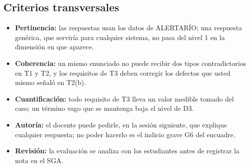 \documentclass[11pt]{article}
\newcommand{\subseccion}[1]{\subsection{\textcolor{midblue}{#1}}}
\begin{document}
\subseccion{Criterios transversales}

\begin{itemize}[leftmargin=18pt,itemsep=2pt]
	\item \textbf{Pertinencia:} las respuestas usan los datos de ALERTARÍO; una respuesta genérica, que serviría para cualquier sistema, no pasa del nivel 1 en la dimensión en que aparece.
	\item \textbf{Coherencia:} un mismo enunciado no puede recibir dos tipos contradictorios en T1 y T2, y los requisitos de T3 deben corregir los defectos que usted mismo señaló en T2(b).
	\item \textbf{Cuantificación:} todo requisito de T3 lleva un valor medible tomado del caso; un término vago que se mantenga baja el nivel de D3.
	\item \textbf{Autoría:} el docente puede pedirle, en la sesión siguiente, que explique cualquier respuesta; no poder hacerlo es el indicio grave G6 del encuadre.
	\item \textbf{Revisión:} la evaluación se analiza con los estudiantes antes de registrar la nota en el SGA.
\end{itemize}




\end{document}
